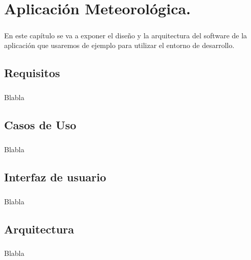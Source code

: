 \chapter{Aplicación Meteorológica.}\label{sec:AplicacionMeteorologica}

\paragraph{}En este capítulo se va a exponer el diseño y la arquitectura del software
de la aplicación que usaremos de ejemplo para utilizar el entorno de desarrollo.

\section{Requisitos}

\paragraph{}Blabla

\section{Casos de Uso}

\paragraph{}Blabla

\section{Interfaz de usuario}

\paragraph{}Blabla

\section{Arquitectura}

\paragraph{}Blabla

